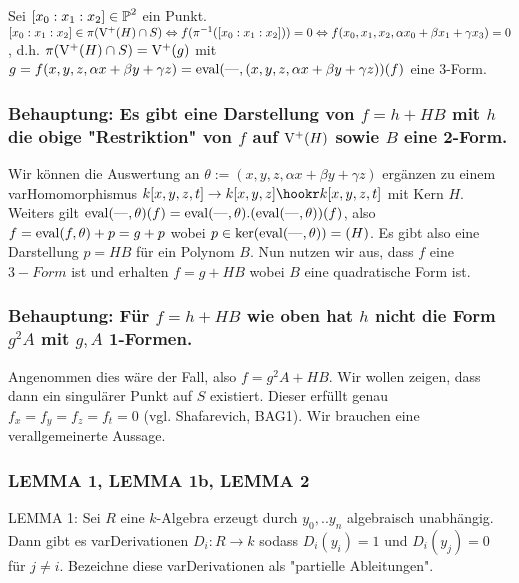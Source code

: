Sei $[x_0:x_1:x_2] \in \operatorname{\mathbb P}^2$ ein Punkt.
$[x_0:x_1:x_2] \in \pi(\operatorname{V^+}(H)\cap S)
\Leftrightarrow f(\pi^{-1}([x_0:x_1:x_2])) = 0
\Leftrightarrow f(x_0,x_1,x_2,\alpha x_0 + \beta x_1 + \gamma x_3) = 0$, d.h. $\pi(\operatorname{V^+}(H)\cap S) = \operatorname{V^+}(g)$ mit $g=f(x, y, z, \alpha x + \beta y + \gamma z) = {\operatorname{eval}}({\operatorname{---}},(x, y, z, \alpha x + \beta y + \gamma z))(f)$ eine 3-Form.

\subsubsection{%
Behauptung: Es gibt eine Darstellung von $f = h + HB$ mit $h$ die obige "Restriktion" von $f$ auf $\operatorname{V^+}(H)$ sowie $B$ eine 2-Form.
} %


Wir können die Auswertung an $\theta := (x,y,z,\alpha x + \beta y + \gamma z)$ ergänzen zu einem var{Hom}omorphismus $k[x,y,z,t] \to k[x,y,z] \hookr k[x,y,z,t]$ mit Kern $H$. Weiters gilt ${\operatorname{eval}}({\operatorname{---}},\theta)(f) = {\operatorname{eval}}({\operatorname{---}},\theta).({\operatorname{eval}}({\operatorname{---}},\theta))(f)$, also $f = {\operatorname{eval}}(f,\theta) + p = g+p$ wobei $p \in \ker({\operatorname{eval}}({\operatorname{---}},\theta)) = (H)$.
Es gibt also eine Darstellung $p = HB$ für ein Polynom $B$.
Nun nutzen wir aus, dass $f$ eine $3-Form$ ist und erhalten $f = g+HB$ wobei $B$ eine quadratische Form ist.

\subsubsection{%
Behauptung: Für $f = h + HB$ wie oben hat $h$ nicht die Form $g^2A$ mit $g,A$ 1-Formen.
} %

Angenommen dies wäre der Fall, also $f = g^2A+HB$.
Wir wollen zeigen, dass dann ein singulärer Punkt auf $S$ existiert.
Dieser erfüllt genau $f_x = f_y = f_z = f_t = 0$ (vgl. Shafarevich, BAG1).
Wir brauchen eine verallgemeinerte Aussage.



\subsubsection{LEMMA 1, LEMMA 1b, LEMMA 2}%
LEMMA 1: Sei $R$ eine $k$-Algebra erzeugt durch $y_0,..y_n$ algebraisch unabhängig.
Dann gibt es var{Der}ivationen $D_i : R \to k$ sodass $D_i(y_i) = 1$ und $D_i(y_j) = 0$ für $j\neq i$. Bezeichne diese var{Der}ivationen als "partielle Ableitungen".


